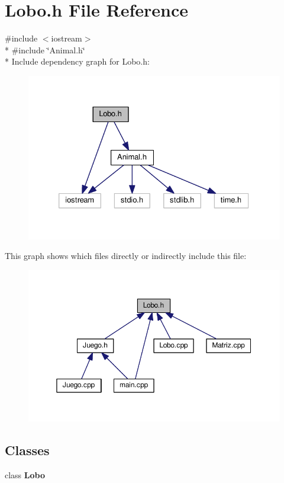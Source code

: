 \section{Lobo.\-h File Reference}
\label{_lobo_8h}
{\ttfamily \#include $<$iostream$>$}\\*
{\ttfamily \#include \char`\"{}Animal.\-h\char`\"{}}\\*
Include dependency graph for Lobo.\-h\-:
\nopagebreak
\begin{figure}[H]
\begin{center}
\leavevmode
\includegraphics[width=326pt]{_lobo_8h__incl}
\end{center}
\end{figure}
This graph shows which files directly or indirectly include this file\-:
\nopagebreak
\begin{figure}[H]
\begin{center}
\leavevmode
\includegraphics[width=350pt]{_lobo_8h__dep__incl}
\end{center}
\end{figure}
\subsection*{Classes}
\begin{DoxyCompactItemize}
\item 
class {\bf Lobo}
\end{DoxyCompactItemize}
